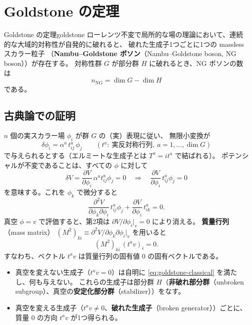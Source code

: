 \documentclass[uplatex,dvipdfmx,a4paper,11pt,openany]{jsbook}
\newcommand{\term}[2]{\textbf{#1}（#2）}
\numberwithin{equation}{chapter}
\theoremstyle{definition}
\theoremstyle{plain}
\theoremstyle{remark}
\begin{document}
\section{Goldstone の定理}
\label{sec:goldstone-thm}
\begin{mythm}{Goldstone の定理}{goldstone}
ローレンツ不変で局所的な場の理論において、連続的な大域的対称性が自発的に破れると、
破れた生成子1つごとに1つの massless スカラー粒子
（\term{Nambu--Goldstone ボソン}{Nambu--Goldstone boson, NG boson}）が存在する。
対称性群 $G$ が部分群 $H$ に破れるとき、NG ボソンの数は
\begin{equation}
n_{\mathrm{NG}}=\dim G-\dim H
\label{eq:NG-number}
\end{equation}
である。
\end{mythm}
\subsection{古典論での証明}
$n$ 個の実スカラー場 $\phi_i$ が群 $G$ の（実）表現に従い、
無限小変換が
\begin{equation}
\delta\phi_i=\alpha^a\,t^a_{ij}\,\phi_j
\qquad(t^a:\ \text{実反対称行列},\ a=1,\dots,\dim G)
\end{equation}
で与えられるとする（エルミートな生成子とは $T^a=it^a$ で結ばれる）。
ポテンシャルが不変であることは、すべての $\phi$ に対して
\begin{equation}
\delta V=\frac{\partial V}{\partial\phi_i}\,\alpha^a t^a_{ij}\phi_j=0
\quad\Longrightarrow\quad
\frac{\partial V}{\partial\phi_i}\,t^a_{ij}\phi_j=0
\label{eq:V-invariance}
\end{equation}
を意味する。これを $\phi_k$ で微分すると
\begin{equation}
\frac{\partial^2V}{\partial\phi_k\partial\phi_i}\,t^a_{ij}\phi_j+\frac{\partial V}{\partial\phi_i}\,t^a_{ik}=0 .
\end{equation}
真空 $\phi=v$ で評価すると、第2項は $\partial V/\partial\phi_i|_v=0$ により消える。
\term{質量行列}{mass matrix} $(M^2)_{ki}\equiv\partial^2V/\partial\phi_k\partial\phi_i|_v$ を用いると
\begin{equation}
(M^2)_{ki}\,(t^av)_i=0 .
\label{eq:goldstone-classical}
\end{equation}
すなわち、ベクトル $t^av$ は質量行列の固有値 0 の固有ベクトルである。
\begin{itemize}
    \item 真空を変えない生成子（$t^av=0$）は自明に \eqref{eq:goldstone-classical} を満たし、何も与えない。
    これらの生成子は部分群 $H$（\term{非破れ部分群}{unbroken subgroup}、真空の\term{安定化部分群}{stabilizer}）をなす。
    \item 真空を変える生成子（$t^av\ne0$、\term{破れた生成子}{broken generator}）ごとに、
    質量 0 の方向 $t^av$ が1つ得られる。
\end{itemize}
\end{document}

